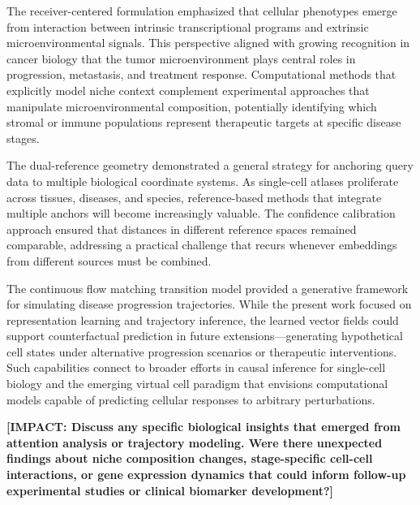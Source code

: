 The receiver-centered formulation emphasized that cellular phenotypes emerge from interaction between intrinsic transcriptional programs and extrinsic microenvironmental signals. This perspective aligned with growing recognition in cancer biology that the tumor microenvironment plays central roles in progression, metastasis, and treatment response. Computational methods that explicitly model niche context complement experimental approaches that manipulate microenvironmental composition, potentially identifying which stromal or immune populations represent therapeutic targets at specific disease stages.

The dual-reference geometry demonstrated a general strategy for anchoring query data to multiple biological coordinate systems. As single-cell atlases proliferate across tissues, diseases, and species, reference-based methods that integrate multiple anchors will become increasingly valuable. The confidence calibration approach ensured that distances in different reference spaces remained comparable, addressing a practical challenge that recurs whenever embeddings from different sources must be combined.

The continuous flow matching transition model provided a generative framework for simulating disease progression trajectories. While the present work focused on representation learning and trajectory inference, the learned vector fields could support counterfactual prediction in future extensions---generating hypothetical cell states under alternative progression scenarios or therapeutic interventions. Such capabilities connect to broader efforts in causal inference for single-cell biology and the emerging virtual cell paradigm that envisions computational models capable of predicting cellular responses to arbitrary perturbations.

\textbf{[IMPACT: Discuss any specific biological insights that emerged from attention analysis or trajectory modeling. Were there unexpected findings about niche composition changes, stage-specific cell-cell interactions, or gene expression dynamics that could inform follow-up experimental studies or clinical biomarker development?]}

